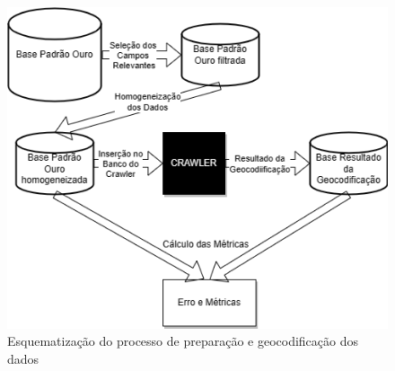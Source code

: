 \begin{figure}
    \centering
    \includegraphics[width=\textwidth]{Figuras/diagrama monografia.drawio.png}
    \caption{Esquematização do processo de preparação e geocodificação dos dados}
    \label{fig:diagramaMono}
\end{figure}

